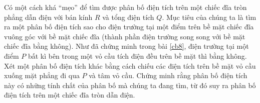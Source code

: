     
    \begin{vd}
        Có một cách khá ``mẹo'' để tìm được phân bố điện tích trên một chiếc đĩa tròn phẳng dẫn điện với bán kính $R$ và tổng điện tích $Q$. Mục tiêu của chúng ta là tìm ra một phân bố điện tích sao cho điện trường tại một điểm trên bề mặt chiếc đĩa vuông góc với bề mặt chiếc đĩa (thành phần điện trường song song với bề mặt chiếc đĩa bằng không). Như đã chứng minh trong bài \ref{cb8}, điện trường tại một điểm $P$ bất kì bên trong một vỏ cầu tích điện đều trên bề mặt thì bằng không. Xét một phân bố điện tích khác bằng cách chiếu các điện tích trên bề mặt vỏ cầu xuống mặt phẳng đi qua $P$ và tâm vỏ cầu. Chứng minh rằng phân bố điện tích này có những tính chất của phân bố mà chúng ta đang tìm, từ đó suy ra phân bố điện tích trên một chiếc đĩa tròn dẫn điện. 
    \end{vd}
